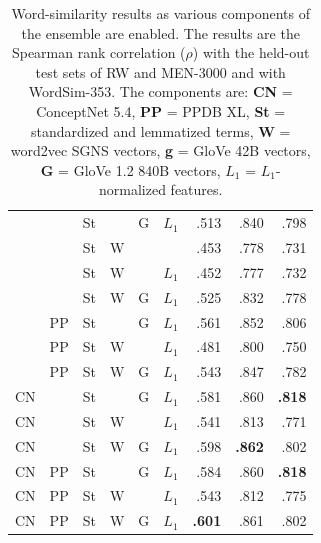 \documentclass[11pt,letterpaper]{article}
\begin{document}
\begin{table}[t]
\begin{tabular}{llllll|rrr}
     &      & St   &      & G    & $L_1$  &    .513 &    .840 &    .798 \\  %
     &      & St   & W    &      &        &    .453 &    .778 &    .731 \\  %
     &      & St   & W    &      & $L_1$  &    .452 &    .777 &    .732 \\  %
     &      & St   & W    & G    & $L_1$  &    .525 &    .832 &    .778 \\  %
\midrule
     & PP   & St   &      & G    & $L_1$  &    .561 &    .852 &    .806 \\  %
     & PP   & St   & W    &      & $L_1$  &    .481 &    .800 &    .750 \\  %
     & PP   & St   & W    & G    & $L_1$  &    .543 &    .847 &    .782 \\  %
CN   &      & St   &      & G    & $L_1$  &    .581 &    .860 &\bf .818 \\  %
CN   &      & St   & W    &      & $L_1$  &    .541 &    .813 &    .771 \\  %
CN   &      & St   & W    & G    & $L_1$  &    .598 &\bf .862 &    .802 \\  %
CN   & PP   & St   &      & G    & $L_1$  &    .584 &    .860 &\bf .818 \\  %
CN   & PP   & St   & W    &      & $L_1$  &    .543 &    .812 &    .775 \\  %
CN   & PP   & St   & W    & G    & $L_1$  &\bf .601 &    .861 &    .802 \\  %
\bottomrule
\end{tabular}

\caption{
    Word-similarity results as various components of the ensemble are enabled.
    The results are the Spearman rank correlation ($\rho$) with the held-out
    test sets of RW and MEN-3000 and with WordSim-353.
    The components are: {\bf CN} = ConceptNet 5.4,
    {\bf PP} = PPDB XL, {\bf St} = standardized and lemmatized terms,
    {\bf W} = word2vec SGNS vectors, {\bf g} = GloVe 42B vectors,
    {\bf G} = GloVe 1.2 840B vectors, {\bf $L_1$} = $L_1$-normalized features.
}
\label{eval-bigtable}
\end{table}
\end{document}
